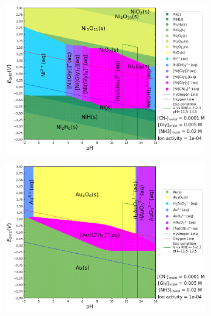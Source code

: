 \documentclass[journal=jacsat,manuscript=article]{achemso}
\begin{document}
\begin{figure}[htbp]
    \centering
    \begin{subfigure}[b]{0.3\textwidth}
        \subcaption{}\label{fig:Ni_Pourbaix_CN_CH3_Gly}
        \includegraphics[width=\textwidth]{Figures/pourbaix_diagrams/Ni-NH3-H2O_activity=1e-04_[NH3]=0.02M_[Gly]=0.005M_[CN]=0.0001.png}
        \par\medskip
    \end{subfigure}
    \begin{subfigure}[b]{0.3\textwidth}
        \subcaption{}\label{fig:Au_Pourbaix_CN_CH3_Gly}
        \includegraphics[width=\textwidth]{Figures/pourbaix_diagrams/Au-NH3-H2O_activity=1e-04_[NH3]=0.02M_[Gly]=0.005M_[CN]=0.0001.png}

\end{subfigure}
\end{figure}
\end{document}
